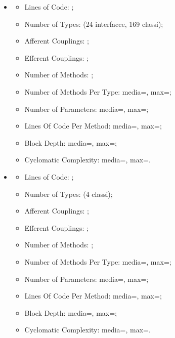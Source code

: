 \begin{itemize}
    \item {}
  \begin{itemize}
  \item Lines of Code: ;
  \item Number of Types:  (24 interfacce, 169 classi);
  \item Afferent Couplings: ;
  \item Efferent Couplings: ;
  \item Number of Methods: ;
  \item Number of Methods Per Type: media=, max=;
  \item Number of Parameters: media=, max=;
  \item Lines Of Code Per Method: media=, max=;
  \item Block Depth: media=, max=;
  \item Cyclomatic Complexity: media=, max=.
  \end{itemize}
    \item {}
  \begin{itemize}
  \item Lines of Code: ;
  \item Number of Types:  (4 classi);
  \item Afferent Couplings: ;
  \item Efferent Couplings: ;
  \item Number of Methods: ;
  \item Number of Methods Per Type: media=, max=;
  \item Number of Parameters: media=, max=;
  \item Lines Of Code Per Method: media=, max=;
  \item Block Depth: media=, max=;
  \item Cyclomatic Complexity: media=, max=.
  \end{itemize}
\end{itemize}  

